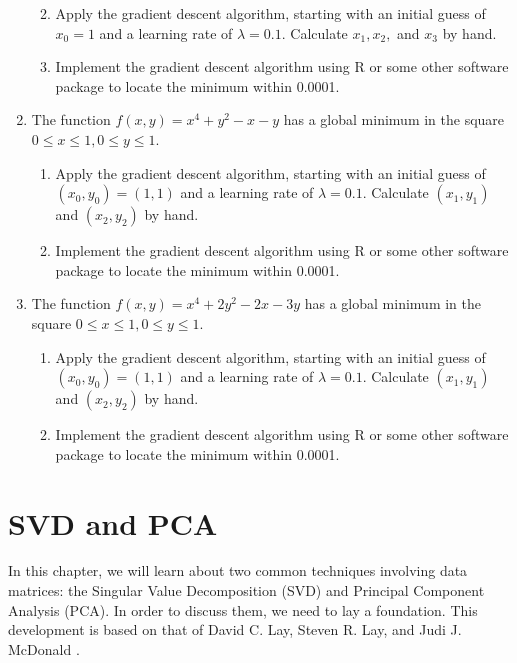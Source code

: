 \documentclass[
]{book}
\providecommand{\tightlist}{%
  \setlength{\itemsep}{0pt}\setlength{\parskip}{0pt}}
\theoremstyle{definition}
\theoremstyle{definition}
\theoremstyle{definition}
\theoremstyle{definition}
\theoremstyle{remark}
\begin{document}
\begin{enumerate}
  \begin{enumerate}
  \def\labelenumii{\alph{enumii}.}
  \tightlist
  \item
    Apply the gradient descent algorithm, starting with an initial guess of \(x_0=1\) and a learning rate of \(\lambda=0.1.\) Calculate \(x_1,x_2,\) and \(x_3\) by hand.
  \item
    Implement the gradient descent algorithm using R or some other software package to locate the minimum within 0.0001.
  \end{enumerate}
\item
  The function \(f(x,y)=x^4+y^2-x-y\) has a global minimum in the square \(0\leq x \leq 1, 0\leq y\leq 1.\)

  \begin{enumerate}
  \def\labelenumii{\alph{enumii}.}
  \tightlist
  \item
    Apply the gradient descent algorithm, starting with an initial guess of \((x_0,y_0)=(1,1)\) and a learning rate of \(\lambda=0.1.\) Calculate \((x_1,y_1)\) and \((x_2,y_2)\) by hand.
  \item
    Implement the gradient descent algorithm using R or some other software package to locate the minimum within 0.0001.
  \end{enumerate}
\item
  The function \(f(x,y)=x^4+2y^2-2x-3y\) has a global minimum in the square \(0\leq x \leq 1, 0\leq y\leq 1.\)

  \begin{enumerate}
  \def\labelenumii{\alph{enumii}.}
  \tightlist
  \item
    Apply the gradient descent algorithm, starting with an initial guess of \((x_0,y_0)=(1,1)\) and a learning rate of \(\lambda=0.1.\) Calculate \((x_1,y_1)\) and \((x_2,y_2)\) by hand.
  \item
    Implement the gradient descent algorithm using R or some other software package to locate the minimum within 0.0001.
  \end{enumerate}
\end{enumerate}

\chapter{SVD and PCA}\label{svd-and-pca}

In this chapter, we will learn about two common techniques involving data matrices: the Singular Value Decomposition (SVD) and Principal Component Analysis (PCA). In order to discuss them, we need to lay a foundation. This development is based on that of David C. Lay, Steven R. Lay, and Judi J. McDonald \autocite{LLM}.
\end{document}
